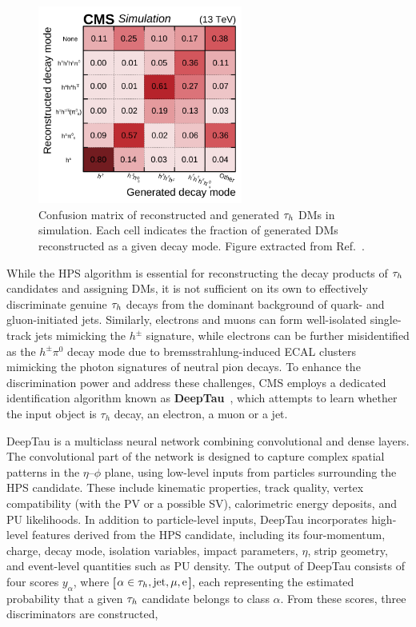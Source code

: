 \begin{figure}[h]
\centering
\includegraphics[width=0.6\textwidth]{Figures/Chapter4/HPS_DecayMode_Performance.pdf}
\caption[Hadronic tau decay mode confusion matrix]{Confusion matrix of reconstructed and generated $\tau_h$ \acp{DM} in simulation. Each cell indicates the fraction of generated \acp{DM} reconstructed as a given decay mode. Figure extracted from Ref.~\cite{DeepTau_20-001}.}
\label{Figure:Chapter4_HPS_ConfusionMatrix}
\end{figure}

While the \ac{HPS} algorithm is essential for reconstructing the decay products of $\tau_h$ candidates and assigning \acp{DM}, it is not sufficient on its own to effectively discriminate genuine $\tau_h$ decays from the dominant background of quark- and gluon-initiated jets. Similarly, electrons and muons can form well-isolated single-track jets mimicking the $h^\pm$ signature, while electrons can be further misidentified as the $h^\pm \pi^0$ decay mode due to bremsstrahlung-induced \ac{ECAL} clusters mimicking the photon signatures of neutral pion decays. To enhance the discrimination power and address these challenges, \ac{CMS} employs a dedicated identification algorithm known as \textbf{DeepTau}~\cite{DeepTau_20-001,DeepTau_24-001}, which attempts to learn whether the input object is $\tau_h$ decay, an electron, a muon or a jet. 

DeepTau is a multiclass neural network combining convolutional and dense layers. The convolutional part of the network is designed to capture complex spatial patterns in the $\eta$–$\phi$ plane, using low-level inputs from particles surrounding the \ac{HPS} candidate. These include kinematic properties, track quality, vertex compatibility (with the \ac{PV} or a possible \ac{SV}), calorimetric energy deposits, and \ac{PU} likelihoods. In addition to particle-level inputs, DeepTau incorporates high-level features derived from the \ac{HPS} candidate, including its four-momentum, charge, decay mode, isolation variables, impact parameters, $\eta$, strip geometry, and event-level quantities such as \ac{PU} density. The output of DeepTau consists of four scores $y_\alpha$, where \textbf{[$\alpha \in {\PGt_h,\text{jet},\mu,\text{e}}$]}, each representing the estimated probability that a given $\tau_h$ candidate belongs to class $\alpha$. From these scores, three discriminators are constructed,

